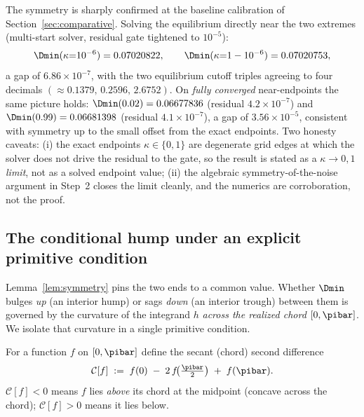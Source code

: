 \begin{remark}
\label{rem:sym-numerics}
The symmetry is sharply confirmed at the baseline calibration of
Section~\ref{sec:comparative}. Solving the equilibrium directly near the two
extremes (multi-start solver, residual gate tightened to $10^{-5}$):
\[
  \Dmin(\kappa{=}10^{-6}) = 0.07020822,
  \qquad
  \Dmin(\kappa{=}1-10^{-6}) = 0.07020753,
\]
a gap of $6.86\times10^{-7}$, with the two equilibrium cutoff triples
agreeing to four decimals $(\approx 0.1379,\,0.2596,\,2.6752)$. On
\emph{fully converged} near-endpoints the same picture holds:
$\Dmin(0.02)=0.06677836$ (residual $4.2\times10^{-7}$) and
$\Dmin(0.99)=0.06681398$ (residual $4.1\times10^{-7}$), a gap of
$3.56\times10^{-5}$, consistent with symmetry up to the small offset from
the exact endpoints. Two honesty caveats: (i) the exact endpoints
$\kappa\in\{0,1\}$ are degenerate grid edges at which the solver does not
drive the residual to the gate, so the result is stated as a $\kappa\to0,1$
\emph{limit}, not as a solved endpoint value; (ii) the algebraic
symmetry-of-the-noise argument in Step~2 closes the limit cleanly, and the
numerics are corroboration, not the proof.
\end{remark}

\subsection{The conditional hump under an explicit primitive condition}
\label{app:hump}

Lemma~\ref{lem:symmetry} pins the two ends to a common value. Whether
$\Dmin$ bulges \emph{up} (an interior hump) or sags \emph{down} (an interior
trough) between them is governed by the curvature of the integrand $h$
\emph{across the realized chord} $[0,\pibar]$. We isolate that curvature in a
single primitive condition.

\begin{definition}
\label{def:chord}
For a function $f$ on $[0,\pibar]$ define the secant (chord) second
difference
\[
  \mathcal{C}[f]
  \;:=\;
  f(0) \;-\; 2\,f\!\bigl(\tfrac{\pibar}{2}\bigr) \;+\; f(\pibar).
\]
$\mathcal{C}[f]<0$ means $f$ lies \emph{above} its chord at the midpoint
(concave across the chord); $\mathcal{C}[f]>0$ means it lies below.
\end{definition}

